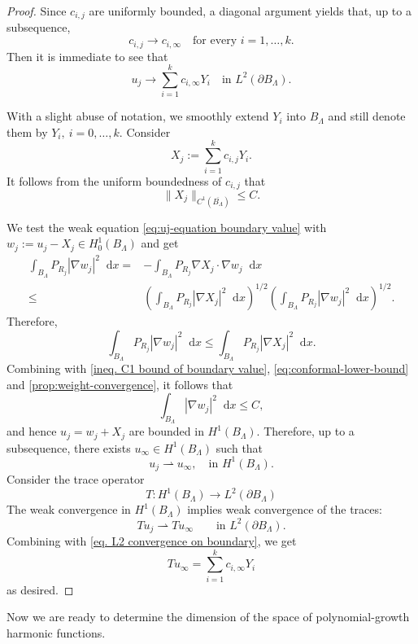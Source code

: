 \documentclass[12pt]{amsart}
\theoremstyle{plain}
\theoremstyle{definition}
\theoremstyle{remark}     %
\numberwithin{equation}{section}
\newcommand{\dd}{\mathop{}\!\mathrm{d}}%
\begin{document}
\begin{proof}
Since $c_{i,j}$ are uniformly bounded, a diagonal argument yields that, up to a subsequence, 
\[
    c_{i,j}\to c_{i,\infty}\quad 
    \text{for every }i=1,\ldots,k.
\]
Then it is immediate  to see that
\begin{equation}\label{eq. L2 convergence on boundary}
    u_j\to \sum_{i=1}^k c_{i,\infty}Y_i
    \quad
    \text{in } L^{2}(\partial B_{\Lambda}).
\end{equation}

With a slight abuse of notation, we smoothly extend $Y_i$ into $B_\Lambda$ and still denote them by $Y_i,\ i=0,\dots,k$.
Consider
\[
     X_j:=\sum_{i=1}^k c_{i,j}Y_i .
\]
It follows from the uniform boundedness of $c_{i,j}$ that
\begin{equation}\label{ineq. C1 bound of boundary value}
    \|X_j\|_{C^1(\overline{B_\Lambda})}
    \leq C.
\end{equation}

We test the weak equation \cref{eq:uj-equation boundary value} with $w_j:=u_j-X_j\in H^1_0(B_\Lambda)$ and  get
\begin{align*}
    \int_{B_\Lambda} P_{R_j}
    |\nabla w_j|^2\dd x
    =&-\int_{B_\Lambda} P_{R_j}
    \nabla X_j\cdot \nabla w_j\dd x \\
    \leq &
    \left(
        \int_{B_\Lambda} P_{R_j}
        |\nabla X_j|^2\dd x
    \right)^{1/2}
    \left(
        \int_{B_\Lambda} P_{R_j}
        |\nabla w_j|^2\dd x
    \right)^{1/2}.
\end{align*}
Therefore,
\[
    \int_{B_\Lambda} P_{R_j}
    |\nabla w_j|^2\dd x
    \le
    \int_{B_\Lambda} P_{R_j}
    |\nabla X_j|^2\dd x .
\]
Combining with \cref{ineq. C1 bound of boundary value}, \cref{eq:conformal-lower-bound} and \cref{prop:weight-convergence}, it follows that
\[
    \int_{B_\Lambda} |\nabla w_j|^2\dd x
    \leq C,
\]
and hence $u_j=w_j+X_j$ are bounded in $H^1(B_\Lambda)$.
Therefore, up to a subsequence, there exists $u_\infty\in H^1(B_\Lambda)$ such that
\[
    u_j\rightharpoonup u_\infty,\quad
    \text{in } H^1(B_\Lambda).
\]
Consider the trace operator
\[
    T:H^1(B_\Lambda)\to L^2(\partial B_\Lambda)
\]
The weak convergence in $H^1(B_\Lambda)$
implies weak convergence of the traces:
\[
    Tu_j\rightharpoonup Tu_\infty
    \qquad
    \text{in }L^2(\partial B_\Lambda).
\]
Combining with \cref{eq. L2 convergence on boundary}, we get
\[
    Tu_\infty
    =\sum_{i=1}^k c_{i,\infty}Y_i
\]
as desired.
\end{proof}
Now we are ready to determine the dimension of the space of polynomial-growth harmonic functions.
\end{document}
